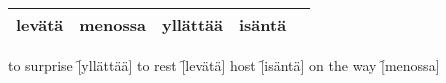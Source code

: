 \begin{center}
  \begin{tabular}{|c c c c c|}
    \hline
    levätä & menossa & yllättää & isäntä & \\
    \hline
  \end{tabular}
\end{center}

\begin{questions}
  \begin{multicols}{2}
    \raggedcolumns
    \question to surprise \f[yllättää]
    \question to rest     \f[levätä]
    \question host        \f[isäntä]
    \question on the way  \f[menossa]
  \end{multicols}
\end{questions}
